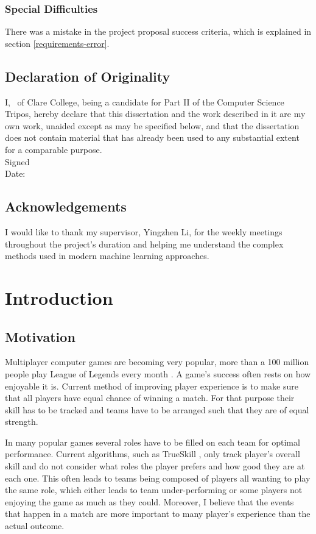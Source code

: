 \documentclass[12pt,a4paper]{book}
\newcommand\college{Clare College}
\begin{document}
\subsection*{Special Difficulties}
There was a mistake in the project proposal success criteria, which is explained in section \ref{requirements-error}.


\section*{Declaration of Originality}
I, \theauthor\ of \college, being a candidate for Part II of the Computer Science Tripos, hereby declare that this dissertation and the work described in it are my own work, unaided except as may be specified below, and that the dissertation does not contain material that has already been used to any substantial extent for a comparable purpose. %
\\[1\baselineskip]
\noindent Signed 
\\[1\baselineskip]
\noindent Date: \thedate

\section*{Acknowledgements}
I would like to thank my supervisor, Yingzhen Li, for the weekly meetings throughout the project's duration and helping me understand the complex methods used in modern machine learning approaches.

\clearpage
\tableofcontents
\listoffigures

\mainmatter
\chapter{Introduction}
\section{Motivation}
Multiplayer computer games are becoming very popular, more than a 100 million people play League of Legends every month \cite{league100}.
A game's success often rests on how enjoyable it is.
Current method of improving player experience is to make sure that all players have equal chance of winning a match.
For that purpose their skill has to be tracked and teams have to be arranged such that they are of equal strength.

In many popular games several roles have to be filled on each team for optimal performance.
Current algorithms, such as TrueSkill \cite{trueskill}, only track player's overall skill and do not consider what roles the player prefers and how good they are at each one.
This often leads to teams being composed of players all wanting to play the same role, which either leads to team under-performing or some players not enjoying the game as much as they could.
Moreover, I believe that the events that happen in a match are more important to many player's experience than the actual outcome.
\end{document}
